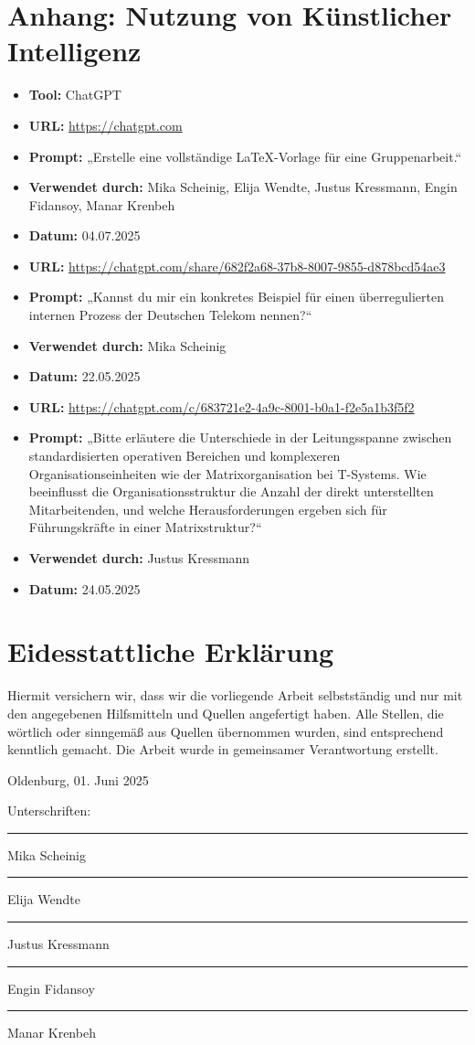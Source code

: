\documentclass[12pt,a4paper]{article}
\begin{document}
	\newpage
	\section{Anhang: Nutzung von Künstlicher Intelligenz}
	\begin{itemize}
		\item \textbf{Tool:} ChatGPT
		\item \textbf{URL:} \url{https://chatgpt.com}
		\item \textbf{Prompt:} „Erstelle eine vollständige LaTeX-Vorlage für eine Gruppenarbeit.“
		\item \textbf{Verwendet durch:} Mika Scheinig, Elija Wendte, Justus Kressmann, Engin Fidansoy, Manar Krenbeh
		\item \textbf{Datum:} 04.07.2025
	\end{itemize}
	\begin{itemize}
		\item \textbf{URL:} \url{https://chatgpt.com/share/682f2a68-37b8-8007-9855-d878bcd54ae3}
		\item \textbf{Prompt:} „Kannst du mir ein konkretes Beispiel für einen überregulierten internen Prozess der Deutschen Telekom nennen?“
		\item \textbf{Verwendet durch:} Mika Scheinig
		\item \textbf{Datum:} 22.05.2025
	\end{itemize}
	
	\begin{itemize}
		\item \textbf{URL:} \url{https://chatgpt.com/c/683721e2-4a9c-8001-b0a1-f2e5a1b3f5f2}
		\item \textbf{Prompt:} „Bitte erläutere die Unterschiede in der Leitungsspanne zwischen standardisierten operativen Bereichen und komplexeren Organisationseinheiten wie der Matrixorganisation bei T-Systems. Wie beeinflusst die Organisationsstruktur die Anzahl der direkt unterstellten Mitarbeitenden, und welche Herausforderungen ergeben sich für Führungskräfte in einer Matrixstruktur?“
		\item \textbf{Verwendet durch:} Justus Kressmann
		\item \textbf{Datum:} 24.05.2025
	\end{itemize}
	
	\newpage
	\section*{Eidesstattliche Erklärung}
	Hiermit versichern wir, dass wir die vorliegende Arbeit selbstständig und nur mit den angegebenen Hilfsmitteln und Quellen angefertigt haben. Alle Stellen, die wörtlich oder sinngemäß aus Quellen übernommen wurden, sind entsprechend kenntlich gemacht. Die Arbeit wurde in gemeinsamer Verantwortung erstellt.
	
	\vspace{2cm}
	Oldenburg, 01. Juni 2025
	
	Unterschriften: \\
	\rule{5cm}{0.4pt} Mika Scheinig \\
	\rule{5cm}{0.4pt} Elija Wendte \\
	\rule{5cm}{0.4pt} Justus Kressmann \\
	\rule{5cm}{0.4pt} Engin Fidansoy \\
	\rule{5cm}{0.4pt} Manar Krenbeh
	
	
	
\end{document}
